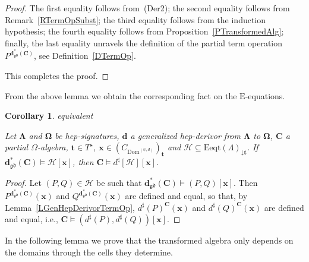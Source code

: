 \documentclass[a4paper, reqno]{amsbook}
\makeatletter
\newcommand{\vs}[1]{\mathbin{\downarrow}#1}
\newcommand{\sig}[1]{\mathbf{#1}}             %
\newcommand{\Dom}{\mathrm{Dom}}
\newcommand{\gd}{\mathfrak{gd}}              %
\theoremstyle{plain}
\newtheorem{corollary}[theorem]{Corollary}
\theoremstyle{definition}
\newcommand*{\CA@leanpending}{}
\newcommand*{\CA@leanrelation}{}
\newcommand*{\lean}[2]{%
  \ifcsname\string\color@lean@#1\endcsname\else
    \PackageError{main}{Unknown relation `#1' in \string\lean}{Use equivalent, weaker or stronger.}%
  \fi
  \gdef\CA@leanrelation{#1}%
  \gdef\CA@leanpending{#2}}
\makeatother
\begin{document}
\begin{proof}
The first equality follows from~(Der2); the second equality follows from Remark~\ref{RTermOpSubst}; the third equality follows from the induction hypothesis; the fourth equality follows from Proposition~\ref{PTransformedAlg}; finally, the last equality unravels the definition of the partial term operation $P^{\mathbf{d}^{\ast}_{\gd}(\mathbf{C})}$, see Definition~\ref{DTermOp}.

This completes the proof.
\end{proof}

From the above lemma we obtain the corresponding fact on the $\mathrm{E}$-equations.

\begin{corollary}\label{CGenHepDerivorEq}\lean{equivalent}{GeneralizedHepDerivor.satisfies_translateWord}
Let $\sig{\Lambda}$ and $\sig{\Omega}$ be hep-signatures, $\mathbf{d}$ a generalized hep-derivor from $\sig{\Lambda}$ to $\sig{\Omega}$, $\mathbf{C}$ a partial $\Omega$-algebra, $\mathbf{t}\in T^{\star}$, $\mathbf{x}\in(C_{\Dom^{(\psi,d)}})_{\mathbf{t}}$ and $\mathcal{H}\subseteq\mathrm{Eeqt}(\Lambda)_{\vs{\mathbf{t}}}$.
If $\mathbf{d}^{\ast}_{\gd}(\mathbf{C})\models\mathcal{H}[\mathbf{x}]$, then $\mathbf{C}\models d^{\sharp}[\mathcal{H}][\mathbf{x}]$.
\end{corollary}
\begin{proof}
Let $(P,Q)\in\mathcal{H}$ be such that $\mathbf{d}^{\ast}_{\gd}(\mathbf{C})\models(P,Q)[\mathbf{x}]$.
Then $P^{\mathbf{d}^{\ast}_{\gd}(\mathbf{C})}(\mathbf{x})$ and $Q^{\mathbf{d}^{\ast}_{\gd}(\mathbf{C})}(\mathbf{x})$ are defined and equal, so that, by Lemma~\ref{LGenHepDerivorTermOp}, $d^{\sharp}(P)^{\mathbf{C}}(\mathbf{x})$ and $d^{\sharp}(Q)^{\mathbf{C}}(\mathbf{x})$ are defined and equal, i.e., $\mathbf{C}\models(d^{\sharp}(P),d^{\sharp}(Q))[\mathbf{x}]$.
\end{proof}

In the following lemma we prove that the transformed algebra only depends on the domains through the cells they determine.
\end{document}
